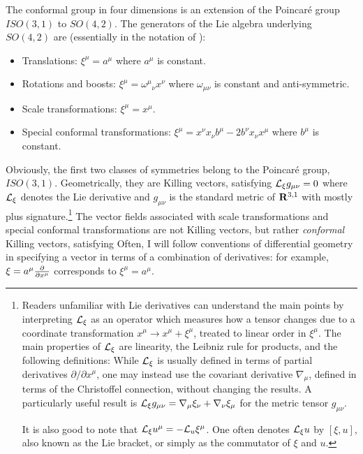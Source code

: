 \documentclass[12pt]{article}
\begin{document}
The conformal group in four dimensions is an extension of the Poincar\'e group $ISO(3,1)$ to $SO(4,2)$.  The generators of the Lie algebra underlying $SO(4,2)$ are (essentially in the notation of \cite{Ginsparg:1988ui}):
 \begin{itemize}
  \item Translations: $\xi^\mu = a^\mu$ where $a^\mu$ is constant.
  \item Rotations and boosts: $\xi^\mu = \omega^\mu{}_\nu x^\nu$ where $\omega_{\mu\nu}$ is constant and anti-symmetric.
  \item Scale transformations: $\xi^\mu = x^\mu$.
  \item Special conformal transformations: $\xi^\mu = x^\nu x_\nu b^\mu - 2 b^\nu x_\nu x^\mu$ where $b^\mu$ is constant.
 \end{itemize}
Obviously, the first two classes of symmetries belong to the Poincar\'e group, $ISO(3,1)$.  Geometrically, they are Killing vectors, satisfying ${\cal L}_\xi g_{\mu\nu} = 0$ where ${\cal L}_\xi$ denotes the Lie derivative and $g_{\mu\nu}$ is the standard metric of ${\bf R}^{3,1}$ with mostly plus signature.\footnote{Readers unfamiliar with Lie derivatives can understand the main points by interpreting ${\cal L}_\xi$ as an operator which measures how a tensor changes due to a coordinate transformation $x^\mu \to x^\mu + \xi^\mu$, treated to linear order in $\xi^\mu$.  The main properties of ${\cal L}_\xi$ are linearity, the Leibniz rule for products, and the following definitions:
While ${\cal L}_\xi$ is usually defined in terms of partial derivatives $\partial/\partial x^\mu$, one may instead use the covariant derivative $\nabla_\mu$, defined in terms of the Christoffel connection, without changing the results.  A particularly useful result is ${\cal L}_\xi g_{\mu\nu} = \nabla_\mu \xi_\nu + \nabla_\nu \xi_\mu$ for the metric tensor $g_{\mu\nu}$.

It is also good to note that ${\cal L}_\xi u^\mu = -{\cal L}_u \xi^\mu$.  One often denotes ${\cal L}_\xi u$ by $[\xi,u]$, also known as the Lie bracket, or simply as the commutator of $\xi$ and $u$.}  The vector fields associated with scale transformations and special conformal transformations are not Killing vectors, but rather {\it conformal} Killing vectors, satisfying
Often, I will follow conventions of differential geometry in specifying a vector in terms of a combination of derivatives: for example, $\xi = a^\mu {\partial \over \partial x^\mu}$ corresponds to $\xi^\mu = a^\mu$.
\end{document}
